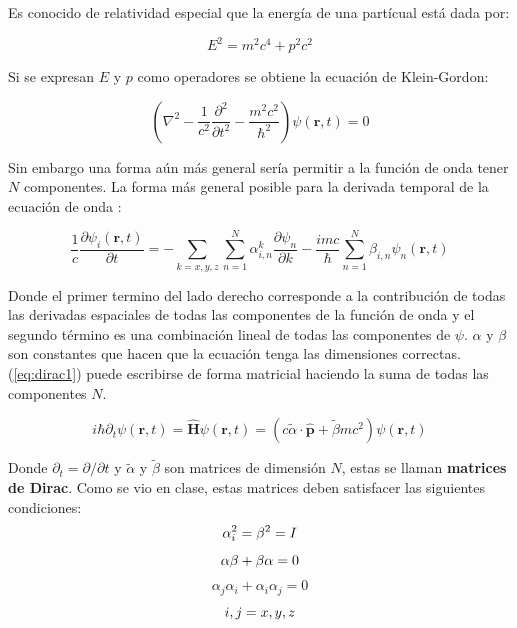 \documentclass[a4paper, 12pt]{article} %
\begin{document}
Es conocido de relatividad especial que la energ\'ia de una part\'icual est\'a dada
por:

\begin{equation}
E^2 = m^2c^4 + p^2c^2
\end{equation}

Si se expresan $E$ y $p$ como operadores se obtiene la ecuaci\'on de Klein-Gordon:

\begin{equation}
\left( \nabla^2 - \dfrac{1}{c^2}\dfrac{\partial^2}{\partial t^2} - \dfrac{m^2c^2}{\hbar^2}   \right)\psi(\mathbf{r}, t) = 0
\end{equation} 


Sin embargo una forma a\'un m\'as general ser\'ia permitir a la funci\'on de onda tener $N$ componentes. La forma m\'as 
general posible para la derivada temporal de la ecuaci\'on de onda \cite{dirac1,dirac2}:

\begin{equation}\label{eq:dirac1}
\dfrac{1}{c}\dfrac{\partial \psi_i(\mathbf{r},t)}{\partial t} =
- \sum \limits_{k=x,y,z} \sum \limits_{n=1}^{N}\alpha^k_{i,n} \dfrac{\partial \psi_n}{\partial k} -
\dfrac{imc}{\hbar}\sum \limits_{n=1}^{N}\beta_{i,n}\psi_n(\mathbf{r}, t)
\end{equation}

Donde el primer termino del lado derecho corresponde a la contribuci\'on 
de todas las derivadas espaciales de todas las componentes de la funci\'on 
de onda y el segundo t\'ermino es una combinaci\'on lineal de todas las 
componentes de $\psi$. $\alpha$ y $\beta$ son constantes que hacen que la 
ecuaci\'on tenga las dimensiones correctas. (\ref{eq:dirac1}) puede escribirse
de forma matricial haciendo la suma de todas las componentes $N$.   

\begin{equation}\label{dirac}
i\hbar \partial_t \psi(\mathbf{r},t) = \hat{\mathbf{H}}\psi(\mathbf{r},t) =
(c\widetilde{\alpha}\cdot \hat{\mathbf{p}} + \widetilde{\beta}mc^2)\psi(\mathbf{r},t)
\end{equation}

Donde $\partial_t = \partial / \partial t$ y $\widetilde{\alpha}$ y $\widetilde{\beta}$ son matrices de dimensi\'on $N$, 
estas se llaman \textbf{matrices de Dirac}.
Como se vio en clase, estas matrices deben satisfacer las siguientes condiciones:\\

\[
\alpha_i^2 = \beta^2 = I \\
\]
\[
\alpha \beta + \beta \alpha = 0 \\
\]
\[
\alpha_j \alpha_i + \alpha_i \alpha_j = 0
\]
\[
i,j=x, y, z\\
\] 
\end{document}
